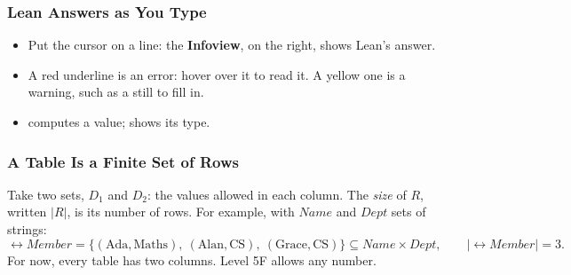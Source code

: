 \documentclass{ltx-talk}
\begin{document}
\begin{frame*}
  \frametitle{Lean Answers as You Type}
  \begin{itemize}
    \item Put the cursor on a line: the \textbf{Infoview}, on the right,
      shows Lean's answer.
    \item A red underline is an error: hover over it to read it. A yellow
      one is a warning, such as a  still to fill in.
    \item {} computes a value;  shows its type.
  \end{itemize}
  \setuptag
\end{frame*}


\begin{frame}
  \frametitle{A Table Is a Finite Set of Rows}
  Take two sets, $D_1$ and $D_2$: the values allowed in each column.
  The \emph{size} of $R$, written $|R|$, is its number of
  rows. For example, with $\mathit{Name}$ and $\mathit{Dept}$ sets of
  strings:
  \[
    \rel{Member} = \{(\text{Ada}, \text{Maths}),\ (\text{Alan},
    \text{CS}),\ (\text{Grace}, \text{CS})\} \subseteq \mathit{Name}
    \times \mathit{Dept}, \qquad |\rel{Member}| = 3.
  \]
  For now, every table has two columns. Level 5F allows any number.
\end{frame}
\end{document}
